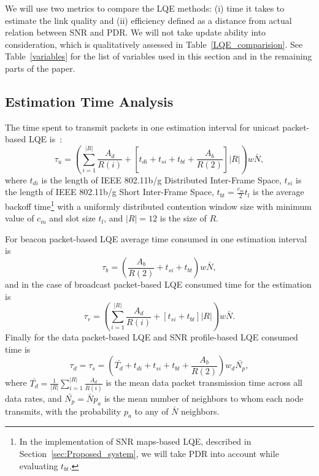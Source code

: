 \documentclass[11pt,draftclsnofoot,journal,onecolumn]{IEEEtran}
\begin{document}
We will use two metrics to compare the LQE methods: (i) time it takes to estimate the link quality and (ii) efficiency defined as a distance from actual relation between SNR and PDR. We will not take update ability into consideration, which is qualitatively assessed in Table~\ref{LQE_comparision}. See Table~\ref{variables} for the list of variables used in this section and in the remaining parts of the paper.

\subsection{Estimation Time Analysis}

The time spent to transmit packets in one estimation interval for unicast packet-based LQE is~\cite[Sec. II-A]{verma_2008_Wimesh}:
\begin{equation}
\tau_u=\left(\sum_{i=1}^{|R|}\frac{A_{d}}{R(i)}+\left[t_{di}+t_{si}+t_{bt}+\frac{A_b}{R(2)}\right]|R|\right)w\bar{N},
\end{equation}
where $t_{di}$ is the length of IEEE 802.11b/g Distributed Inter-Frame Space, $t_{si}$ is the length of IEEE 802.11b/g Short Inter-Frame Space, $t_{bt}=\frac{c_{m}}{2}t_l$ is the average backoff time\footnote{In the implementation of SNR maps-based LQE, described in Section~\ref{sec:Proposed_system}, we will take PDR into account while evaluating $t_{bt}$.} with a uniformly distributed contention window size with minimum value of $c_{m}$ and slot size $t_l$, and $|R|=12$ is the size of $R$.

For beacon packet-based LQE average time consumed in one estimation interval is
\begin{equation}
\tau_b=\left(\frac{A_b}{R(2)}+t_{si}+t_{bt}\right)w\bar{N},
\end{equation}
and in the case of broadcast packet-based LQE consumed time for the estimation is
\begin{equation}
\tau_r=\left(\sum_{i=1}^{|R|}\frac{A_d}{R(i)}+[t_{si}+t_{bt}]|R|\right)w\bar{N}.
\end{equation}
Finally for the data packet-based LQE and SNR profile-based LQE consumed time is
\begin{equation}
\tau_d=\tau_s=\left(\bar{T_d}+t_{di}+t_{si}+t_{bt}+\frac{A_b}{R(2)}\right)w_d\bar{N_p},
\end{equation}
where $\bar{T_d}=\frac{1}{|R|}\sum_{i=1}^{|R|}\frac{A_{d}}{R(i)}$ is the mean data packet transmission time across all data rates, and $\bar{N_p}=\bar{N}p_a$ is the mean number of neighbors to whom each node transmits, with the probability $p_a$ to any of $\bar{N}$ neighbors.
\end{document}
